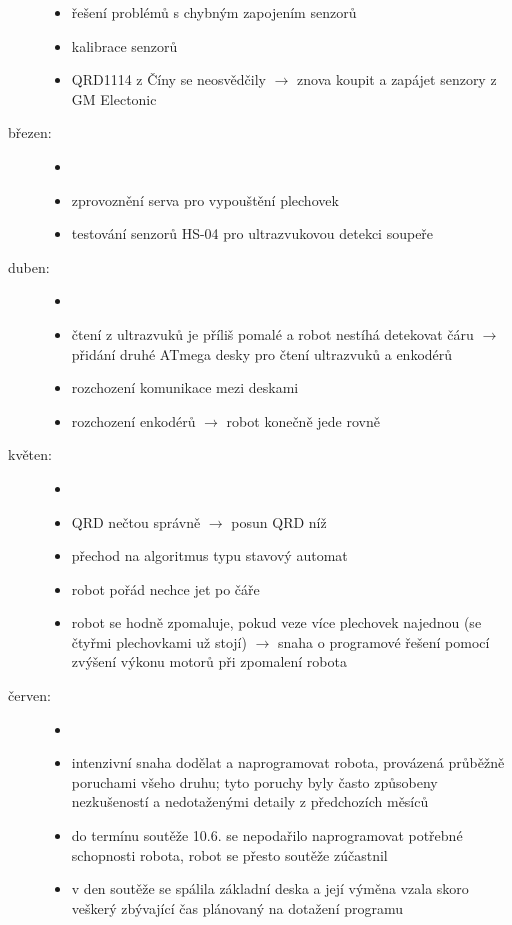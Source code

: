 \begin{description}
\begin{itemize}
		\item řešení problémů s chybným zapojením senzorů 
		\item kalibrace senzorů 
		\item QRD1114 z Číny se neosvědčily $\rightarrow$ znova koupit a zapájet senzory z GM Electonic		
	\end{itemize} 
	
	\item[březen:] 
	\begin{itemize}
		\item[]
		\item zprovoznění serva pro vypouštění plechovek
		\item testování senzorů HS-04 pro ultrazvukovou detekci soupeře 
	\end{itemize}  
	
	\item[duben:] 
	\begin{itemize}
		\item[]
		\item čtení z ultrazvuků je příliš pomalé a robot nestíhá detekovat čáru $\rightarrow$
		přidání druhé ATmega desky pro čtení ultrazvuků a enkodérů
		\item rozchození komunikace mezi deskami 
		\item rozchození enkodérů $\rightarrow$ robot konečně jede rovně 
	\end{itemize}  
	
	\item[květen:] 
	\begin{itemize}
		\item[]
		\item QRD nečtou správně $\rightarrow$ posun QRD níž
		\item přechod na algoritmus typu stavový automat
		\item robot pořád nechce jet po čáře
		\item robot  se hodně zpomaluje, pokud veze více plechovek najednou (se čtyřmi plechovkami už stojí) $\rightarrow$ snaha o programové řešení pomocí zvýšení výkonu motorů při zpomalení robota
	\end{itemize}
	
	
	\item[červen:] 
	\begin{itemize}
		\item[]
		\item intenzivní snaha dodělat a naprogramovat robota, provázená průběžně poruchami všeho druhu;
		tyto poruchy byly často způsobeny nezkušeností a nedotaženými detaily z předchozích měsíců  
		\item do termínu soutěže 10.6. se nepodařilo naprogramovat potřebné schopnosti robota, robot se přesto soutěže zúčastnil
		\item v den soutěže se spálila základní deska a její výměna vzala skoro veškerý zbývající čas plánovaný na dotažení programu  
	\end{itemize} 
\end{description}
	
